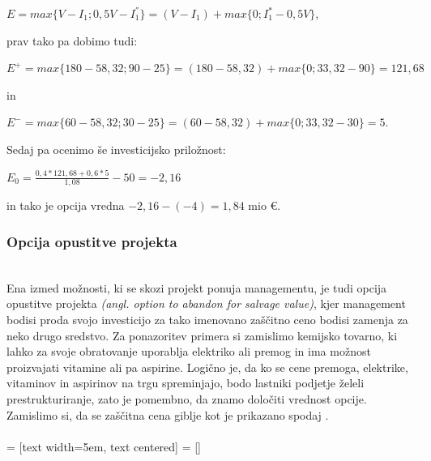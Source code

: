 \begin{center}
$E = max\{V - I_1; 0,5V - I^{''}_1\} = (V-I_1) + max\{0; I^*_1-0,5V\}$,
\end{center}
prav tako pa dobimo tudi:\\
\begin{center}
$E^+ = max\{180-58,32; 90-25\} = (180-58,32) + max\{0; 33,32-90\}= 121,68$
\end{center}
in
\begin{center}
$E^- = max\{60-58,32; 30-25\} = (60-58,32) +  max\{0; 33,32-30\} = 5$.
\end{center}

Sedaj pa ocenimo še investicijsko priložnost:\\
\begin{center}
$E_0 = \tfrac{0,4 * 121,68 + 0,6 * 5}{1,08} - 50 = -2,16 $
\end{center}
in tako je opcija vredna $-2,16-(-4) = 1,84$ mio €. \\

\subsubsection{Opcija opustitve projekta}
\cite[str. 166, 167]{Trigeorgis}\\
Ena izmed možnosti, ki se skozi projekt ponuja managementu, je tudi opcija opustitve projekta \textit{(angl. option to abandon for salvage value)}, kjer management bodisi proda svojo investicijo za tako imenovano zaščitno ceno bodisi zamenja za neko drugo sredstvo. Za ponazoritev primera si zamislimo kemijsko tovarno, ki lahko za svoje obratovanje uporablja elektriko ali premog in ima možnost proizvajati vitamine ali pa aspirine. Logično je, da ko se cene premoga, elektrike, vitaminov in aspirinov na trgu spreminjajo, bodo lastniki podjetje želeli prestrukturiranje, zato je pomembno, da znamo določiti vrednost opcije. Zamislimo si, da se zaščitna cena giblje kot je prikazano spodaj . \\
\\

 = [text width=5em, text centered]
 = []

